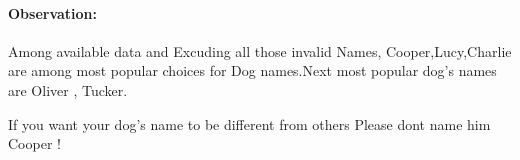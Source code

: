 \documentclass[11pt]{article}
\begin{document}
    \paragraph{Observation:}\label{observation}

Among available data and Excuding all those invalid Names,
Cooper,Lucy,Charlie are among most popular choices for Dog names.Next
most popular dog's names are Oliver , Tucker.

If you want your dog's name to be different from others Please dont name
him Cooper !


    
    
    
    
\end{document}
